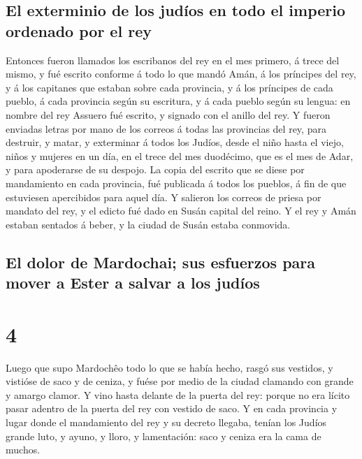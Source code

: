 \hypertarget{el-exterminio-de-los-juduxedos-en-todo-el-imperio-ordenado-por-el-rey}{%
\subsection{El exterminio de los judíos en todo el imperio ordenado por
el
rey}\label{el-exterminio-de-los-juduxedos-en-todo-el-imperio-ordenado-por-el-rey}}

 Entonces fueron llamados los escribanos del rey en el
mes primero, á trece del mismo, y fué escrito conforme á todo lo que
mandó Amán, á los príncipes del rey, y á los capitanes que estaban sobre
cada provincia, y á los príncipes de cada pueblo, á cada provincia según
su escritura, y á cada pueblo según su lengua: en nombre del rey Assuero
fué escrito, y signado con el anillo del rey.  Y fueron
enviadas letras por mano de los correos á todas las provincias del rey,
para destruir, y matar, y exterminar á todos los Judíos, desde el niño
hasta el viejo, niños y mujeres en un día, en el trece del mes
duodécimo, que es el mes de Adar, y para apoderarse de su despojo.
 La copia del escrito que se diese por mandamiento en
cada provincia, fué publicada á todos los pueblos, á fin de que
estuviesen apercibidos para aquel día.  Y salieron los
correos de priesa por mandato del rey, y el edicto fué dado en Susán
capital del reino. Y el rey y Amán estaban sentados á beber, y la ciudad
de Susán estaba conmovida.

\hypertarget{el-dolor-de-mardochai-sus-esfuerzos-para-mover-a-ester-a-salvar-a-los-juduxedos}{%
\subsection{El dolor de Mardochai; sus esfuerzos para mover a Ester a
salvar a los
judíos}\label{el-dolor-de-mardochai-sus-esfuerzos-para-mover-a-ester-a-salvar-a-los-juduxedos}}

\hypertarget{section-17-4}{%
\section{4}\label{section-17-4}}

 Luego que supo Mardochêo todo lo que se había hecho,
rasgó sus vestidos, y vistióse de saco y de ceniza, y fuése por medio de
la ciudad clamando con grande y amargo clamor.  Y vino
hasta delante de la puerta del rey: porque no era lícito pasar adentro
de la puerta del rey con vestido de saco.  Y en cada
provincia y lugar donde el mandamiento del rey y su decreto llegaba,
tenían los Judíos grande luto, y ayuno, y lloro, y lamentación: saco y
ceniza era la cama de muchos.

